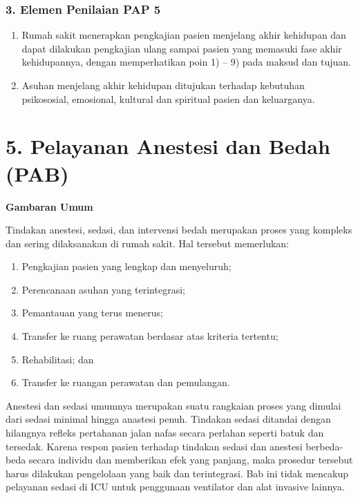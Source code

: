 \documentclass[
]{book}
\providecommand{\tightlist}{%
  \setlength{\itemsep}{0pt}\setlength{\parskip}{0pt}}
\begin{document}
\hypertarget{elemen-penilaian-pap-5}{%
\subsubsection*{3. Elemen Penilaian PAP 5}\label{elemen-penilaian-pap-5}}

\begin{enumerate}
\def\labelenumi{\alph{enumi}.}
\tightlist
\item
  Rumah sakit menerapkan pengkajian pasien menjelang akhir kehidupan dan dapat dilakukan pengkajian ulang sampai pasien yang memasuki fase akhir kehidupannya, dengan memperhatikan poin 1) -- 9) pada maksud dan tujuan.
\item
  Asuhan menjelang akhir kehidupan ditujukan terhadap kebutuhan psikososial, emosional, kultural dan spiritual pasien dan keluarganya.
\end{enumerate}

\hypertarget{pelayanan-anestesi-dan-bedah-pab}{%
\section*{5. Pelayanan Anestesi dan Bedah (PAB)}\label{pelayanan-anestesi-dan-bedah-pab}}

\textbf{Gambaran Umum}

Tindakan anestesi, sedasi, dan intervensi bedah merupakan proses yang kompleks dan sering dilaksanakan di rumah sakit. Hal tersebut memerlukan:

\begin{enumerate}
\def\labelenumi{\alph{enumi}.}
\tightlist
\item
  Pengkajian pasien yang lengkap dan menyeluruh;
\item
  Perencanaan asuhan yang terintegrasi;
\item
  Pemantauan yang terus menerus;
\item
  Transfer ke ruang perawatan berdasar atas kriteria tertentu;
\item
  Rehabilitasi; dan
\item
  Transfer ke ruangan perawatan dan pemulangan.
\end{enumerate}

Anestesi dan sedasi umumnya merupakan suatu rangkaian proses yang dimulai dari sedasi minimal hingga anastesi penuh. Tindakan sedasi ditandai dengan hilangnya refleks pertahanan jalan nafas secara perlahan seperti batuk dan tersedak. Karena respon pasien terhadap tindakan sedasi dan anestesi berbeda-beda secara individu dan memberikan efek yang panjang, maka prosedur tersebut harus dilakukan pengelolaan yang baik dan terintegrasi. Bab ini tidak mencakup pelayanan sedasi di ICU untuk penggunaan ventilator dan alat invasive lainnya.
\end{document}

